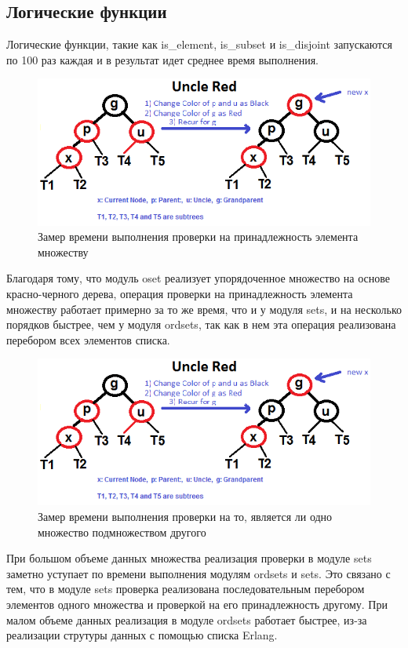 	\subsection{Логические функции}
		Логические функции, такие как is\_element, is\_subset и is\_disjoint запускаются по 100 раз
		каждая и в результат идет среднее время выполнения.
		\begin{figure}[H]
				\centering
				\includegraphics[width=\textwidth]{img/tan-aus.png}
				\caption{Замер времени выполнения проверки на принадлежность элемента множеству}
		\end{figure}
		Благодаря тому, что модуль oset реализует упорядоченное множество на основе красно-черного дерева, операция
		проверки на принадлежность элемента множеству работает примерно за то же время, что и у модуля sets, и на 
		несколько порядков быстрее, чем у модуля ordsets, так как в нем эта операция реализована перебором всех элементов
		списка.  
		
		\begin{figure}[H]
				\centering
				\includegraphics[width=\textwidth]{img/tan-aus.png}
				\caption{Замер времени выполнения проверки на то, является ли одно множество подмножеством другого}
		\end{figure}
		При большом объеме данных множества реализация проверки в модуле sets заметно уступает по времени 
		выполнения модулям ordsets и sets. Это связано с тем, что в модуле sets проверка реализована 
		последовательным перебором элементов одного множества и проверкой на его принадлежность другому. При малом 
		объеме данных реализация в модуле ordsets работает быстрее, из-за реализации струтуры данных с помощью 
		списка Erlang.  
		
